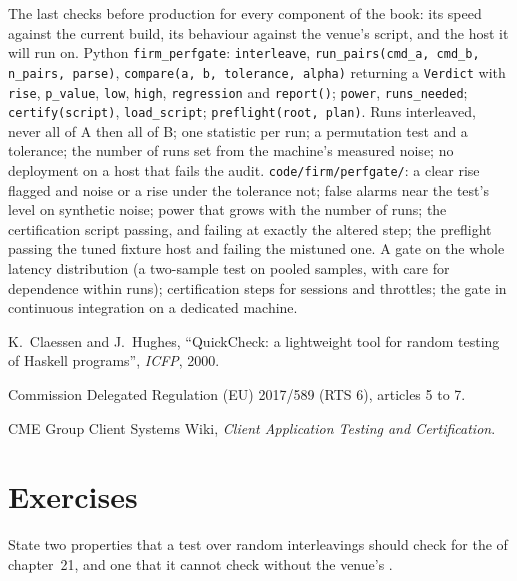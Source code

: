 \begin{build}
 The last checks before production for every component of the book: its speed against the current build, its
behaviour against the venue's script, and the host it will run on.
 Python \texttt{firm\_perfgate}: \texttt{interleave}, \texttt{run\_pairs(cmd\_a, cmd\_b, n\_pairs, parse)},
\texttt{compare(a, b, tolerance, alpha)} returning a \texttt{Verdict} with \texttt{rise}, \texttt{p\_value}, \texttt{low},
\texttt{high}, \texttt{regression} and \texttt{report()}; \texttt{power}, \texttt{runs\_needed}; \texttt{certify(script)},
\texttt{load\_script}; \texttt{preflight(root, plan)}.
 Runs interleaved, never all of A then all of B; one statistic per run; a permutation test and a tolerance; the
number of runs set from the machine's measured noise; no deployment on a host that fails the audit.
 \texttt{code/firm/perfgate/}: a clear rise flagged and noise or a rise under the tolerance not; false
alarms near the test's level on synthetic noise; power that grows with the number of runs; the certification script passing,
and failing at exactly the altered step; the preflight passing the tuned fixture host and failing the mistuned one.
 A gate on the whole latency distribution (a two-sample test on pooled samples, with care for dependence within
runs); certification steps for sessions and throttles; the gate in continuous integration on a dedicated machine.
\end{build}

\begin{omsources}
\item K.~Claessen and J.~Hughes, ``QuickCheck: a lightweight tool for random testing of Haskell programs'', \emph{ICFP}, 2000.
\item Commission Delegated Regulation (EU) 2017/589 (RTS 6), articles 5 to 7.
\item CME Group Client Systems Wiki, \emph{Client Application Testing and Certification}.
\end{omsources}

\section{Exercises}

\begin{exercise}[$\star$]\label{exo:ll:testing-and-deploying-low-latency-systems:1}
State two properties that a test over random interleavings should check for the  of chapter~21, and one that it
cannot check without the venue's .
\end{exercise}

